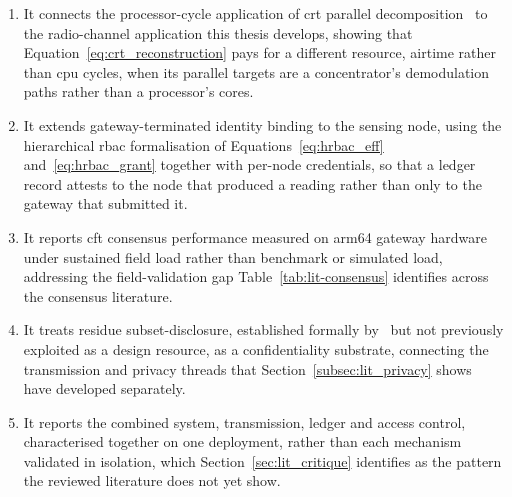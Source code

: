 \documentclass[12pt,a4paper,oneside]{book}
\begin{document}
\begin{enumerate}
  \item It connects the processor-cycle application of \gls{crt} parallel
        decomposition~\cite{beloa2025bitcoincrt} to the radio-channel
        application this thesis develops, showing that
        Equation~\ref{eq:crt_reconstruction} pays for a different resource,
        airtime rather than \gls{cpu} cycles, when its parallel targets are
        a concentrator's demodulation paths rather than a processor's
        cores.
  \item It extends gateway-terminated identity binding to the sensing
        node, using the hierarchical \gls{rbac} formalisation of
        Equations~\ref{eq:hrbac_eff} and~\ref{eq:hrbac_grant}
        \cite{beloasone2025hrbac} together with per-node credentials, so
        that a ledger record attests to the node that produced a reading
        rather than only to the gateway that submitted it.
  \item It reports \gls{cft} consensus performance measured on \gls{arm64}
        gateway hardware under sustained field load rather than benchmark
        or simulated load, addressing the field-validation gap
        Table~\ref{tab:lit-consensus} identifies across the consensus
        literature.
  \item It treats residue subset-disclosure, established formally
        by~\cite{goldreich1999china,shoup2009computational} but not
        previously exploited as a design resource, as a confidentiality
        substrate, connecting the transmission and privacy threads that
        Section~\ref{subsec:lit_privacy} shows have developed
        separately.
  \item It reports the combined system, transmission, ledger and access
        control, characterised together on one deployment, rather than
        each mechanism validated in isolation, which
        Section~\ref{sec:lit_critique} identifies as the pattern the
        reviewed literature does not yet show.
\end{enumerate}
\clearpage{}


\backmatter

\begin{singlespace}
\printbibliography[heading=none]
\end{singlespace}

\appendix
\renewcommand{\thechapterword}{\thechapter}
\makeatletter\global\@mainmattertrue\makeatother
\clearpage{}
\end{document}
